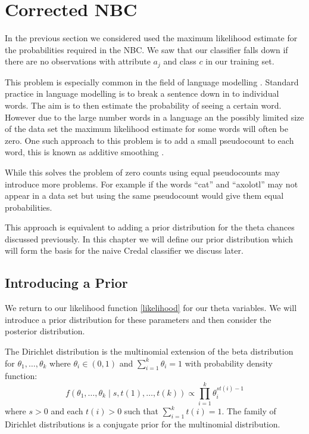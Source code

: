 \chapter{Corrected NBC}

In the previous section we considered used the maximum likelihood estimate for the probabilities required in the NBC.
We saw that our classifier falls down if there are no observations with attribute $a_j$ and class $c$ in our training set.

This problem is especially common in the field of language modelling \cite{Chen96}.
Standard practice in language modelling is to break a sentence down in to individual words.
The aim is to then estimate the probability of seeing a certain word.
However due to the large number words in a language an the possibly limited size of the data set the maximum likelihood estimate for some words will often be zero.
One such approach to this problem is to add a small pseudocount to each word, this is known as additive smoothing \cite{Manning08}.

While this solves the problem of zero counts using equal pseudocounts may introduce more problems.
For example if the words ``cat'' and ``axolotl'' may not appear in a data set but  using the same pseudocount would give them equal probabilities.

This approach is equivalent to adding a prior distribution for the theta chances discussed previously.
In this chapter we will define our prior distribution which will form the basis for the naive Credal classifier we discuss later.

\section{Introducing a Prior}
We return to our likelihood function \cref{likelihood} for our theta variables.
We will introduce a prior distribution for these parameters and then consider the posterior distribution.

The Dirichlet distribution is the multinomial extension of the beta distribution for $\theta_1,\dots,\theta_k$ where $\theta_i \in (0,1)$ and $\sum_{i=1}^k \theta_i = 1$ with probability density function:
\begin{equation} \label{dirichlet_pdf}
	f(\theta_1,\dots,\theta_k \mid s, t(1),\dots,t(k)) \propto \prod_{i=1}^k \theta_i^{st(i) - 1}
\end{equation}
where $s > 0$ and each $t(i)>0$ such that $\sum_{i=1}^{k}t(i) = 1$.
The family of Dirichlet distributions is a conjugate prior for the multinomial distribution.

